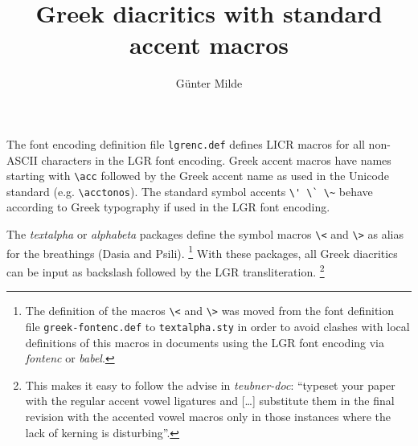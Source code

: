 \documentclass[a4paper,polutonikogreek,british]{article}
\begin{document}

\title{Greek diacritics with standard accent macros}
\author{G\"unter Milde}
\date{\filedate}
\maketitle

The font encoding definition file \texttt{lgrenc.def} defines LICR macros
for all non-ASCII characters in the LGR font encoding. Greek accent macros
have names starting with \verb|\acc| followed by the Greek accent name as
used in the Unicode standard (e.g. \verb|\acctonos|). The standard symbol
accents \verb|\' \` \~| behave according to Greek typography if used in the
LGR font encoding.

The \emph{textalpha} or \emph{alphabeta} packages define the symbol macros
\verb|\<| and \verb|\>| as alias for the breathings (Dasia and Psili).%
\footnote{The definition of the macros 
          \texttt{\textbackslash<} and \texttt{\textbackslash>} was moved
	  from the font definition file \texttt{greek-fontenc.def} to
	  \texttt{textalpha.sty} in order to avoid clashes with local
	  definitions of this macros in documents using the LGR font
	  encoding via \emph{fontenc} or \emph{babel}.}
With these packages, all Greek diacritics can be input as backslash followed
by the LGR transliteration.%
\footnote{This makes it easy to follow the advise in
	  \emph{teubner-doc}: ``typeset your paper with the regular
	  accent vowel ligatures and [{\ldots}] substitute them in the
	  final revision with the accented vowel macros only in those
	  instances where the lack of kerning is disturbing''.}
\end{document}
